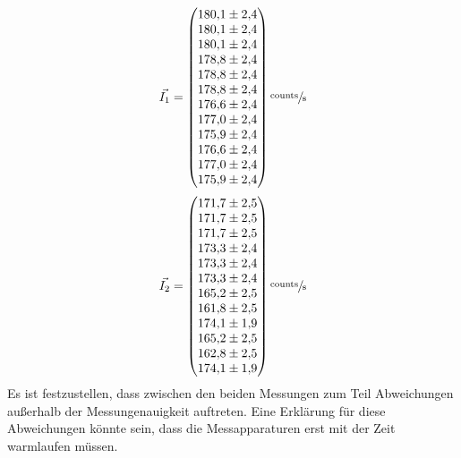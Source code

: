 \begin{equation}
	\vec{I_1}=
	\begin{pmatrix}
		\num{180.1 \pm 2.4} \\
		\num{180.1 \pm 2.4} \\
		\num{180.1\pm 2.4} \\
		\num{178.8\pm 2.4} \\
		\num{178.8\pm 2.4} \\
		\num{178.8\pm 2.4} \\
		\num{176.6\pm 2.4} \\
		\num{177.0\pm 2.4} \\
		\num{175.9\pm 2.4} \\
    \num{176.6\pm 2.4} \\
    \num{177.0\pm 2.4} \\
    \num{175.9\pm 2.4} \\
	\end{pmatrix}
    \sfrac{\text{counts}}{\text{s}}
	\label{eq:vecleer1}
\end{equation}
\begin{equation}
	\vec{I_2}=
	\begin{pmatrix}
		\num{171.7 \pm 2.5} \\
		\num{171.7 \pm 2.5} \\
		\num{171.7\pm 2.5} \\
		\num{173.3\pm 2.4} \\
		\num{173.3\pm 2.4} \\
		\num{173.3\pm 2.4} \\
		\num{165.2\pm 2.5} \\
		\num{161.8\pm 2.5} \\
		\num{174.1\pm 1.9} \\
    \num{165.2\pm 2.5} \\
    \num{162.8\pm 2.5} \\
    \num{174.1\pm 1.9} \\
	\end{pmatrix}
    \sfrac{\text{counts}}{\text{s}}
	\label{eq:vecleer2}
\end{equation}
Es ist festzustellen, dass zwischen den beiden Messungen zum Teil Abweichungen außerhalb der Messungenauigkeit auftreten. Eine Erklärung für diese Abweichungen könnte sein, dass die Messapparaturen erst mit der Zeit warmlaufen müssen.
